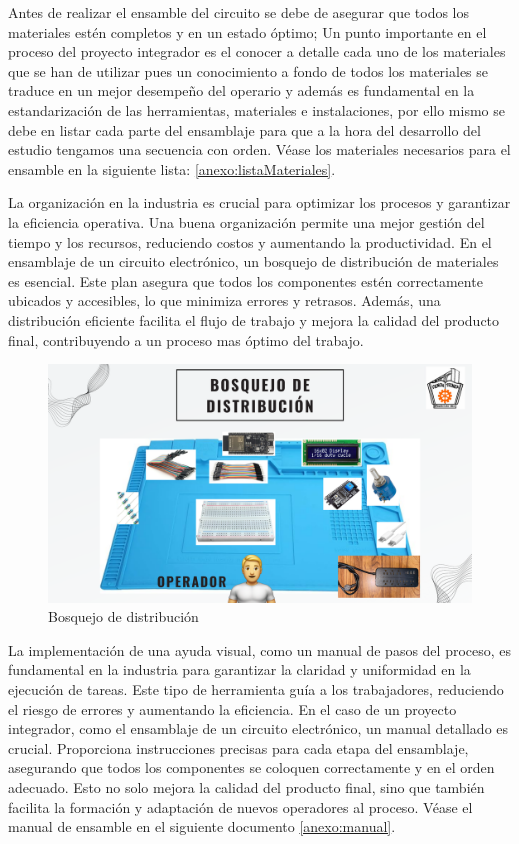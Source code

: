     Antes de realizar el ensamble del circuito se debe de asegurar que todos los materiales estén completos y en un estado óptimo; Un punto importante en el proceso del proyecto integrador es el conocer a detalle cada uno de los materiales que se han de utilizar pues un conocimiento a fondo de todos los materiales se traduce en un mejor desempeño del operario y además es fundamental en la estandarización de las herramientas, materiales e instalaciones, por ello mismo se debe en listar cada parte del ensamblaje para que a la hora del desarrollo del estudio tengamos una secuencia con orden. Véase los materiales necesarios para el ensamble en la siguiente lista: \ref{anexo:listaMateriales}.
    
    La organización en la industria es crucial para optimizar los procesos y garantizar la eficiencia operativa. Una buena organización permite una mejor gestión del tiempo y los recursos, reduciendo costos y aumentando la productividad. En el ensamblaje de un circuito electrónico, un bosquejo de distribución de materiales es esencial. Este plan asegura que todos los componentes estén correctamente ubicados y accesibles, lo que minimiza errores y retrasos. Además, una distribución eficiente facilita el flujo de trabajo y mejora la calidad del producto final, contribuyendo a un proceso mas óptimo del trabajo. 
    \begin{figure}[H]
        \centering
        \includegraphics[scale=0.16]{35/Img/bosquejoDistribucion.pdf}
        \caption{Bosquejo de distribución}
        \label{fig:bosquejoDistribucion}
    \end{figure}
    
    
    La implementación de una ayuda visual, como un manual de pasos del proceso, es fundamental en la industria para garantizar la claridad y uniformidad en la ejecución de tareas. Este tipo de herramienta guía a los trabajadores, reduciendo el riesgo de errores y aumentando la eficiencia. En el caso de un proyecto integrador, como el ensamblaje de un circuito electrónico, un manual detallado es crucial. Proporciona instrucciones precisas para cada etapa del ensamblaje, asegurando que todos los componentes se coloquen correctamente y en el orden adecuado. Esto no solo mejora la calidad del producto final, sino que también facilita la formación y adaptación de nuevos operadores al proceso.
    Véase el manual de ensamble en el siguiente documento \ref{anexo:manual}.
    
